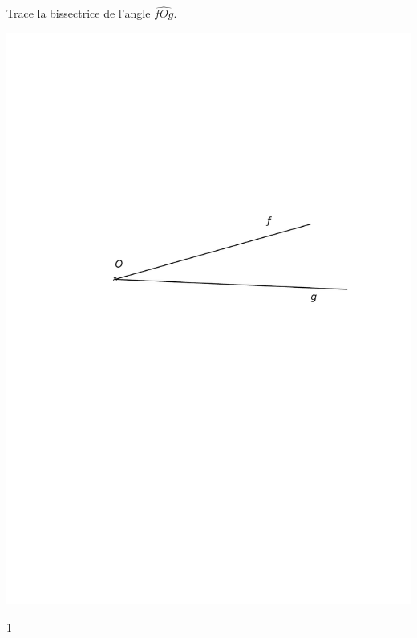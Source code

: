 \documentclass[a4paper,11pt]{report}
\begin{document}
\begin{exop}
{Trace la bissectrice de l'angle $\widehat{fOg}$.
\begin{center}
	\includegraphics[scale=1]{media/es-10/12-11}
\end{center}
\vspace{1cm}
%
}
{1}
\end{exop}
\end{document}
